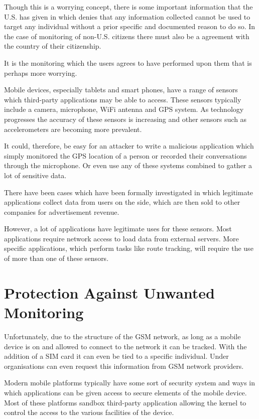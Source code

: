 \documentclass[12pt, a4paper]{article}
\begin{document}
Though this is a worrying concept, there is some important information that the
U.S. has given in \cite{clapper2013facts} which denies that any information
collected cannot be used to target any individual without a prior specific and
documented reason to do so. In the case of monitoring of non-U.S. citizens
there must also be a agreement with the country of their citizenship.

It is the monitoring which the users agrees to have performed upon them that is
perhaps more worrying.

Mobile devices, especially tablets and smart phones, have a range of sensors
which third-party applications may be able to access. These sensors typically
include a camera, microphone, WiFi antenna and GPS system. As technology
progresses the accuracy of these sensors is increasing and other sensors such
as accelerometers are becoming more prevalent.

It could, therefore, be easy for an attacker to write a malicious application
which simply monitored the GPS location of a person or recorded their
conversations through the microphone. Or even use any of these systems combined
to gather a lot of sensitive data.

There have been cases which have been formally
investigated\cite{ftc2013flashlight} in which legitimate applications collect
data from users on the side, which are then sold to other companies for
advertisement revenue.

However, a lot of applications have legitimate uses for these sensors. Most
applications require network access to load data from external servers. More
specific applications, which perform tasks like route tracking, will require
the use of more than one of these sensors.

\section{Protection Against Unwanted Monitoring}

Unfortunately, due to the structure of the \gls{GSM} network, as long as a
mobile device is on and allowed to connect to the network it can be tracked.
With the addition of a \gls{SIM} card it can even be tied to a specific
individual. Under \cite{directive2006/24/EC} organisations can even request
this information from \gls{GSM} network providers.

Modern mobile platforms typically have some sort of security system and ways in
which applications can be given access to secure elements of the mobile device.
Most of these platforms sandbox third-party application allowing the kernel to
control the access to the various facilities of the device.
\end{document}
